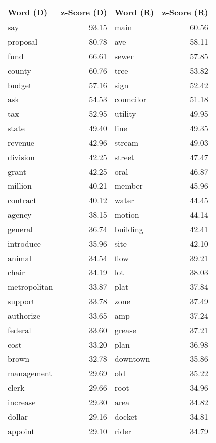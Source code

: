 \begin{table}[ht]
\centering
\begingroup\fontsize{9pt}{10pt}\selectfont
\begin{tabular}{lrlr}
  \hline
Word (D) & z-Score (D) & Word (R) & z-Score (R) \\ 
  \hline
say & 93.15 & main & 60.56 \\ 
  proposal & 80.78 & ave & 58.11 \\ 
  fund & 66.61 & sewer & 57.85 \\ 
  county & 60.76 & tree & 53.82 \\ 
  budget & 57.16 & sign & 52.42 \\ 
  ask & 54.53 & councilor & 51.18 \\ 
  tax & 52.95 & utility & 49.95 \\ 
  state & 49.40 & line & 49.35 \\ 
  revenue & 42.96 & stream & 49.03 \\ 
  division & 42.25 & street & 47.47 \\ 
  grant & 42.25 & oral & 46.87 \\ 
  million & 40.21 & member & 45.96 \\ 
  contract & 40.12 & water & 44.45 \\ 
  agency & 38.15 & motion & 44.14 \\ 
  general & 36.74 & building & 42.41 \\ 
  introduce & 35.96 & site & 42.10 \\ 
  animal & 34.54 & flow & 39.21 \\ 
  chair & 34.19 & lot & 38.03 \\ 
  metropolitan & 33.87 & plat & 37.84 \\ 
  support & 33.78 & zone & 37.49 \\ 
  authorize & 33.65 & amp & 37.24 \\ 
  federal & 33.60 & grease & 37.21 \\ 
  cost & 33.20 & plan & 36.98 \\ 
  brown & 32.78 & downtown & 35.86 \\ 
  management & 29.69 & old & 35.22 \\ 
  clerk & 29.66 & root & 34.96 \\ 
  increase & 29.30 & area & 34.82 \\ 
  dollar & 29.16 & docket & 34.81 \\ 
  appoint & 29.10 & rider & 34.79 \\ 

\end{tabular}
\end{table}
